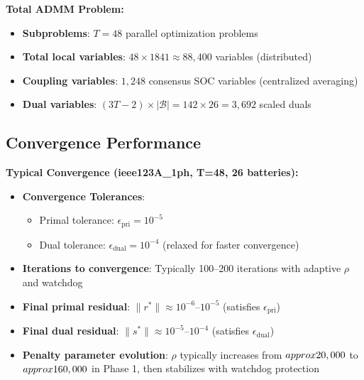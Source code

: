 \documentclass[11pt]{article}
\begin{document}
\textbf{Total ADMM Problem:}
\begin{itemize}
    \item \textbf{Subproblems}: $T = 48$ parallel optimization problems
    \item \textbf{Total local variables}: $48 \times 1841 \approx 88,400$ variables (distributed)
    \item \textbf{Coupling variables}: $1,248$ consensus SOC variables (centralized averaging)
    \item \textbf{Dual variables}: $(3T - 2) \times |\mathcal{B}| = 142 \times 26 = 3,692$ scaled duals
\end{itemize}

\subsection{Convergence Performance}

\textbf{Typical Convergence (ieee123A\_1ph, T=48, 26 batteries):}
\begin{itemize}
    \item \textbf{Convergence Tolerances}:
    \begin{itemize}
        \item Primal tolerance: $\epsilon_{\text{pri}} = 10^{-5}$
        \item Dual tolerance: $\epsilon_{\text{dual}} = 10^{-4}$ (relaxed for faster convergence)
    \end{itemize}
    \item \textbf{Iterations to convergence}: Typically 100--200 iterations with adaptive $\rho$ and watchdog
    \item \textbf{Final primal residual}: $\|r^*\| \approx 10^{-6}$--$10^{-5}$ (satisfies $\epsilon_{\text{pri}}$)
    \item \textbf{Final dual residual}: $\|s^*\| \approx 10^{-5}$--$10^{-4}$ (satisfies $\epsilon_{\text{dual}}$)
    \item \textbf{Penalty parameter evolution}: $\rho$ typically increases from $\\approx 20,000$ to $\\approx 160,000$ in Phase 1, then stabilizes with watchdog protection
\end{itemize}
\end{document}
